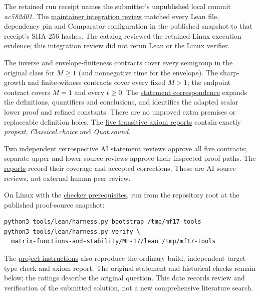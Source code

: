 \documentclass[11pt,a4paper]{article}
\begin{document}
The retained run receipt names the submitter's unpublished local commit
\textit{ac582d01}. The
\href{https://github.com/ajt60gaibb/OpenProblemsInNLA/blob/main/matrix-functions-and-stability/MF-17/lean/reviews/maintainer-integration-2026-09-30.md}{maintainer
integration review} matched every Lean file, dependency pin and
Comparator configuration in the published snapshot to that receipt's
SHA-256 hashes. The catalog reviewed the retained Linux execution
evidence; this integration review did not rerun Lean or the Linux
verifier.

The inverse and envelope-finiteness contracts cover every semigroup in
the original class for \(M\geq1\) (and nonnegative time for the
envelope). The sharp-growth and finite-witness contracts cover every
fixed \(M>1\); the endpoint contract covers \(M=1\) and every
\(t\geq0\). The
\href{https://github.com/ajt60gaibb/OpenProblemsInNLA/blob/main/matrix-functions-and-stability/MF-17/lean/NUMERICAL_TARGETS.md}{statement
correspondence} expands the definitions, quantifiers and conclusions,
and identifies the adapted scalar lower proof and refined constants.
There are no unproved extra premises or replaceable definition holes.
The
\href{https://github.com/ajt60gaibb/OpenProblemsInNLA/blob/main/matrix-functions-and-stability/MF-17/lean/verification/axioms.log}{five
transitive axiom reports} contain exactly \textit{propext},
\textit{Classical.choice} and \textit{Quot.sound}.

Two independent retrospective AI statement reviews approve all five
contracts; separate upper and lower source reviews approve their
inspected proof paths. The
\href{https://github.com/ajt60gaibb/OpenProblemsInNLA/blob/main/matrix-functions-and-stability/MF-17/lean/reviews}{reports}
record their coverage and accepted corrections. These are AI source
reviews, not external human peer review.

On Linux with the
\href{https://github.com/ajt60gaibb/OpenProblemsInNLA/blob/main/tools/lean/HARNESS.md}{checker
prerequisites}, run from the repository root at the published
proof-source snapshot:

\begin{verbatim}
python3 tools/lean/harness.py bootstrap /tmp/mf17-tools
python3 tools/lean/harness.py verify \
  matrix-functions-and-stability/MF-17/lean /tmp/mf17-tools
\end{verbatim}

The
\href{https://github.com/ajt60gaibb/OpenProblemsInNLA/blob/main/matrix-functions-and-stability/MF-17/lean/README.md\#verification}{project
instructions} also reproduce the ordinary build, independent target-type
check and axiom report. The original statement and historical checks
remain below; the ratings describe the original question. This date
records review and verification of the submitted solution, not a new
comprehensive literature search.
\end{document}
